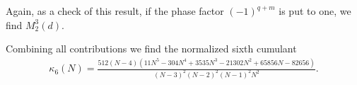 \documentclass[aps,showpacs,floatfix,superscriptaddress,pre,11pt]{revtex4-1}
\newcommand{\nn}{\nonumber}
\newcommand{\be}{\begin{eqnarray}}
\newcommand{\ee}{\end{eqnarray}}
\begin{document}
	Again, as a check of this result,  if the phase factor $(-1)^{q+m}$ is put to one, we find $M_2^3(d)$.
	
	Combining all contributions we find the normalized sixth cumulant
	\be
	\kappa_6(N)= \frac
	{512 (N-4) (11 N^5-304 N^4+3535 N^3-21302 N^2+65856 N-82656)}{(N-3)^2 (N-2)^2 (N-1)^2 N^2}.\nn\\
	\ee

%


\end{document}
